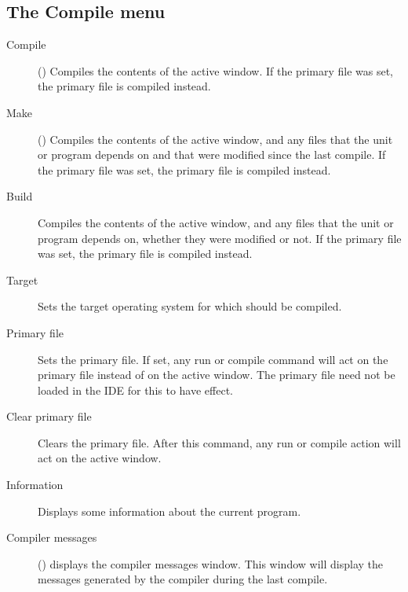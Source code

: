 \subsection{The Compile menu}
\label{se:menucompile}
\begin{description}
\item[Compile] () Compiles the contents of the active window.  
If the primary file was set, the primary file is compiled instead.
\item[Make] () Compiles the contents of the active window, and
any files that the unit or program depends on and that were modified since
the last compile.
If the primary file was set, the primary file is compiled instead.
\item[Build]
Compiles the contents of the active window, and any files that the unit or 
program depends on, whether they were modified or not.
If the primary file was set, the primary file is compiled instead.
\item[Target] Sets the target operating system for which should be compiled. 
\item[Primary file] Sets the primary file. If set, any run or compile command 
will act on the primary file instead of on the active window. The primary
file need not be loaded in the IDE for this to have effect.
\item[Clear primary file]
Clears the primary file. After this command, any run or compile action will
act on the active window.
\item[Information] Displays some information about the current program.
\item[Compiler messages] () displays the compiler messages
window. This window will display the messages generated by the compiler
during the last compile.
\end{description}
%
%
